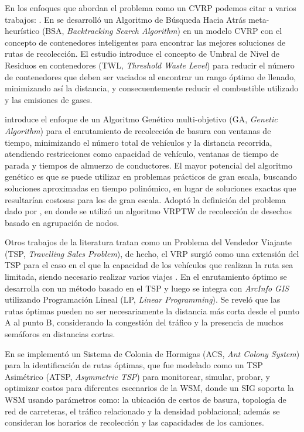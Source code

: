 En los enfoques que abordan el problema como un CVRP podemos citar a varios trabajos: \citet{Akhtar2017BacktrackingOptimization,Ombuki-Berman2007WASTEALGORITHMS,Kim2006WasteWindows,Billa2014GISOptimization,Karadimas2007OptimalAlgorithm}. En \citet{Akhtar2017BacktrackingOptimization} se desarrolló un Algoritmo de Búsqueda Hacia Atrás meta-heurístico (BSA, \textit{Backtracking Search Algorithm}) en un modelo CVRP con el concepto de contenedores inteligentes para encontrar las mejores soluciones de rutas de recolección. El estudio introduce el concepto de Umbral de Nivel de Residuos en contenedores (TWL, \textit{Threshold Waste Level}) para reducir el número de contenedores que deben ser vaciados al encontrar un rango óptimo de llenado, minimizando así la distancia, y consecuentemente reducir el combustible utilizado y las emisiones de gases.

\citet{Ombuki-Berman2007WASTEALGORITHMS} introduce el enfoque de un Algoritmo Genético multi-objetivo (GA, \textit{Genetic Algorithm}) para el enrutamiento de recolección de basura con ventanas de tiempo, minimizando el número total de vehículos y la distancia recorrida, atendiendo restricciones como capacidad de vehículo, ventanas de tiempo de parada y tiempos de almuerzo de conductores. El mayor potencial del algoritmo genético es que se puede utilizar en problemas prácticos de gran escala, buscando soluciones aproximadas en tiempo polinómico, en lugar de soluciones exactas que resultarían costosas para los de gran escala. Adoptó la definición del problema dado por \citet{Kim2006WasteWindows}, en donde se utilizó un algoritmo VRPTW de recolección de desechos basado en agrupación de nodos.

Otros trabajos de la literatura tratan como un Problema del Vendedor Viajante (TSP, \textit{Travelling Sales Problem}), de hecho, el VRP surgió como una extensión del TSP para el caso en el que la capacidad de los vehículos que realizan la ruta sea limitada, siendo necesario realizar varios viajes \citep{CalvinoM2011CooperacionPanoramica}. En \citet{Billa2014GISOptimization} el enrutamiento óptimo se desarrolla con un método basado en el TSP y luego se integra con \textit{ArcInfo GIS} utilizando Programación Lineal (LP, \textit{Linear Programming}). Se reveló que las rutas óptimas pueden no ser necesariamente la distancia más corta desde el punto A al punto B, considerando la congestión del tráfico y la presencia de muchos semáforos en distancias cortas.

En \citet{Karadimas2007OptimalAlgorithm} se implementó un Sistema de Colonia de Hormigas (ACS, \textit{Ant Colony System}) para la identificación de rutas óptimas, que fue modelado como un TSP Asimétrico (ATSP, \textit{Asymmetric TSP}) para monitorear, simular, probar, y optimizar costos para diferentes escenarios de la WSM, donde un SIG soporta la WSM usando parámetros como: la ubicación de cestos de basura, topología de red de carreteras, el tráfico relacionado y la densidad poblacional; además se consideran los horarios de recolección y las capacidades de los camiones.

